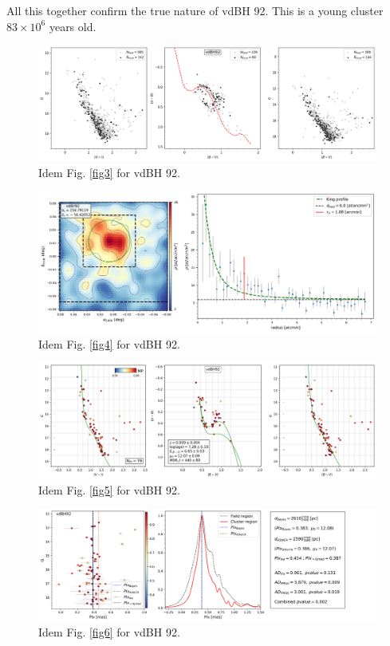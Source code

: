 \documentclass[draft]{aa}
\begin{document}
All this together confirm the true nature of vdBH 92. This is a
young cluster $83\times10^6$ years old.

\begin{figure}[ht]
    \centering
    \includegraphics[width=\hsize]{../figs/obs_vdBH92.png}
    \caption{Idem Fig. \ref{fig3} for vdBH 92.}
    \label{fig35}
\end{figure}
\begin{figure}[ht]
    \centering
    \includegraphics[width=\hsize]{../figs/dmap_vdbh92.png}
    \caption{Idem Fig. \ref{fig4} for vdBH 92.}
    \label{fig36}
\end{figure}
\begin{figure}[ht]
    \centering
    \includegraphics[width=\hsize]{../figs/cmds_vdbh92.png}
    \caption{Idem Fig. \ref{fig5} for vdBH 92.}
    \label{fig37}
\end{figure}
\begin{figure}[ht]
    \centering
    \includegraphics[width=\hsize]{../figs/plx_vdBH92.png}
    \caption{Idem Fig. \ref{fig6} for vdBH 92.}
    \label{fig38}
\end{figure}
\end{document}
